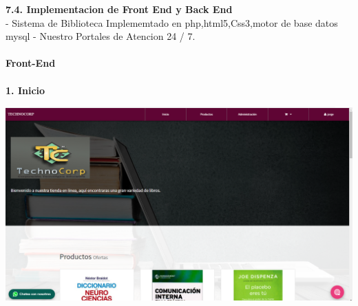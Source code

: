 \begin{flushleft}
\begin{itemize}
\textbf{ }\\
\textbf{ }\\
\textbf{ }\\
\textbf{ }\\
\textbf{ }\\
\textbf{ }\\
\textbf{ }\\
\textbf{ }\\
\textbf{ }\\
\textbf{ }\\
\textbf{ }\\
\textbf{ }\\
\textbf{ }\\
\textbf{ }\\
\textbf{ }\\
\textbf{ }\\
\textbf{ }\\
\textbf{ }\\
\textbf{ }\\
\textbf{ }\\
\textbf{ }\\
\textbf{ }\\
\textbf{7.4.   Implementacion de Front End y Back End  }\\
-	 Sistema de Biblioteca Implememtado en php,html5,Css3,motor de base datos mysql
-          Nuestro  Portales de Atencion 24 / 7.
\textbf{ }\\
\textbf{ }\\
\textbf{ Front-End}\\
\textbf{ }\\
\textbf{1. Inicio }\\
\begin{center}
	\includegraphics[width=16cm]{./Imagenes/web1} 
\end{center}
\textbf{ }\\

\end{itemize}
\end{flushleft}
